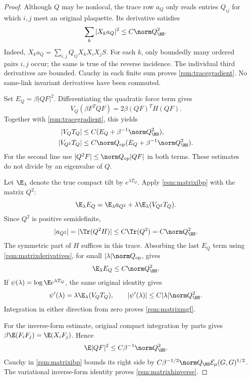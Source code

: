 \begin{proof}
Although \(Q\) may be nonlocal, the trace row \(a_Q\) only reads entries \(Q_{ij}\) for which \(i,j\) meet an original plaquette. Its derivative satisfies
\begin{equation}
 \sum_k|X_ka_Q|^2\le C\norm Q_{\HS}^2.
 \label{rsm:tracegradient}
\end{equation}
Indeed, \(X_ka_Q=\sum_{i,j}Q_{ij}X_kX_iX_jS\). For each \(k\), only boundedly many ordered pairs \(i,j\) occur; the same is true of the reverse incidence. The individual third derivatives are bounded. Cauchy in each finite sum proves \eqref{rsm:tracegradient}. No same-link invariant derivatives have been commuted.

Set \(E_Q=\beta|QF|^2\). Differentiating the quadratic force term gives
\[
 V_Q(\beta F^TQF)=2\beta(QF)^TH(QF).
\]
Together with \eqref{rsm:tracegradient}, this yields
\begin{align}
 |V_QT_Q|
 &\le C(E_Q+\beta^{-1}\norm Q_{\HS}^2),\notag\\
 |V_{Q^2}T_Q|
 &\le C\norm Q_{\rm op}
              (E_Q+\beta^{-1}\norm Q_{\HS}^2).
 \label{rsm:matrixderivatives}
\end{align}
For the second line use \(|Q^2F|\le\norm Q_{\rm op}|QF|\) in both terms. These estimates do not divide by an eigenvalue of \(Q\).

Let \(\E_\lambda\) denote the true compact tilt by \(e^{\lambda T_Q}\). Apply \eqref{rsm:matrixibp} with the matrix \(Q^2\):
\[
 \E_\lambda E_Q
 =\E_\lambda a_{Q^2}
       +\lambda\E_\lambda(V_{Q^2}T_Q).
\]
Since \(Q^2\) is positive semidefinite,
\[
 |a_{Q^2}|=|\Tr(Q^2H)|
 \le C\Tr(Q^2)=C\norm Q_{\HS}^2.
\]
The symmetric part of \(H\) suffices in this trace. Absorbing the last \(E_Q\) term using \eqref{rsm:matrixderivatives}, for small \(|\lambda|\norm Q_{\rm op}\), gives
\[
 \E_\lambda E_Q\le C\norm Q_{\HS}^2.
\]
If \(\psi(\lambda)=\log\E e^{\lambda T_Q}\), the same original identity gives
\[
 \psi'(\lambda)=\lambda\E_\lambda(V_QT_Q),
 \qquad
 |\psi'(\lambda)|\le C|\lambda|\norm Q_{\HS}^2.
\]
Integration in either direction from zero proves \eqref{rsm:matrixmgf}.

For the inverse-form estimate, original compact integration by parts gives
\(\beta\E(F_iF_j)=\E(X_iF_j)\). Hence
\[
 \E|QF|^2\le C\beta^{-1}\norm Q_{\HS}^2.
\]
Cauchy in \eqref{rsm:matrixibp} bounds its right side by
\(C\beta^{-1/2}\norm Q_{\HS}{\cal E}_\mu(G,G)^{1/2}\).
The variational inverse-form identity proves \eqref{rsm:matrixhinverse}.
\end{proof}

